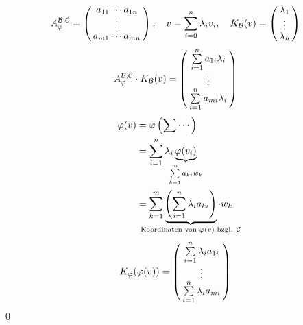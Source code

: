 \begin{align*}
A_\varphi^{\mathcal{B},\mathcal{C}} =
\aMatrix{c}{a_{11}\cdots a_{1n}\\\vdots\\a_{m1}\cdots a_{mn}},
\quad v = \sum\limits_{i=0}^n \lambda_i v_i, \quad K_\mathcal{B}(v) =
\aMatrix{c}{\lambda_1\\\vdots\\\lambda_n}
\end{align*}
\begin{align*}
A_\varphi^{\mathcal{B},\mathcal{C}} \cdot K_\mathcal{B}(v) =
\aMatrix{c}{\sum\limits_{i=1}^n a_{1i}\lambda_i\\\vdots\\\sum\limits_{i=1}^n a_{mi}\lambda_i}
\end{align*}
\begin{align*}
\varphi(v) &= \varphi\left(\sum\cdots\right)\\
&= \sum\limits_{i=1}^n \lambda_i \underbrace{\varphi(v_i)}_{\mathclap{\sum\limits_{k=1}^m a_{ki}w_k}}\\
&= \sum\limits_{k=1}^m \underbrace{\left(\sum\limits_{i=1}^n \lambda_i a_{ki}\right)}_{\mathclap{\text{Koordinaten von }
		\varphi(v) \text{ bzgl. } \mathcal{C}}} \cdot w_k\\
\end{align*}
\begin{align*}
K_\varphi(\varphi(v)) =
\aMatrix{c}{\sum\limits_{i=1}^n \lambda_i a_{1i}\\\vdots\\\sum\limits_{i=1}^n \lambda_i a_{mi}}
\end{align*}
\qed